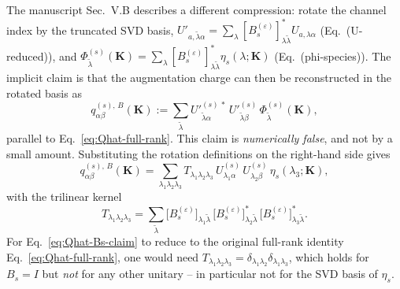 \documentclass[aps,prb,reprint,superscriptaddress,nofootinbib]{revtex4-2}
\begin{document}
The manuscript Sec.~V.B describes a different compression: rotate the
channel index by the truncated SVD basis,
\(U'_{a,\widetilde\lambda\alpha}
=\sum_\lambda[B_s^{(\varepsilon)}]^{*}_{\lambda\widetilde\lambda}
U_{a,\lambda\alpha}\) (Eq.~(U-reduced)), and
\(\Phi^{(s)}_{\widetilde\lambda}(\mathbf K)
=\sum_\lambda[B_s^{(\varepsilon)}]^{*}_{\lambda\widetilde\lambda}
\eta_s(\lambda;\mathbf K)\) (Eq.~(phi-species)).  The implicit claim is
that the augmentation charge can then be reconstructed in the rotated
basis as
\begin{equation}
q^{(s),\,B}_{\alpha\beta}(\mathbf K)
:=\sum_{\widetilde\lambda}
U'^{(s)\,*}_{\widetilde\lambda\alpha}\,
U'^{(s)}_{\widetilde\lambda\beta}\,
\Phi^{(s)}_{\widetilde\lambda}(\mathbf K),
\label{eq:Qhat-Bs-claim}
\end{equation}
parallel to Eq.~\eqref{eq:Qhat-full-rank}.  This claim is
\emph{numerically false}, and not by a small amount.  Substituting
the rotation definitions on the right-hand side gives
\begin{equation}
q^{(s),\,B}_{\alpha\beta}(\mathbf K)
=\sum_{\lambda_1\lambda_2\lambda_3}
T_{\lambda_1\lambda_2\lambda_3}\,
U^{(s)}_{\lambda_1\alpha}\,U^{(s)}_{\lambda_2\beta}\,
\eta_s(\lambda_3;\mathbf K),
\label{eq:Qhat-Bs-trilinear}
\end{equation}
with the trilinear kernel
\begin{equation}
T_{\lambda_1\lambda_2\lambda_3}
=\sum_{\widetilde\lambda}
\bigl[B_s^{(\varepsilon)}\bigr]_{\lambda_1\widetilde\lambda}\,
\bigl[B_s^{(\varepsilon)}\bigr]^{*}_{\lambda_2\widetilde\lambda}\,
\bigl[B_s^{(\varepsilon)}\bigr]^{*}_{\lambda_3\widetilde\lambda}.
\label{eq:trilinear-T}
\end{equation}
For Eq.~\eqref{eq:Qhat-Bs-claim} to reduce to the original full-rank
identity Eq.~\eqref{eq:Qhat-full-rank}, one would need
\(T_{\lambda_1\lambda_2\lambda_3}
=\delta_{\lambda_1\lambda_2}\delta_{\lambda_1\lambda_3}\),
which holds for \(B_s=I\) but \emph{not} for any other unitary -- in
particular not for the SVD basis of \(\eta_s\).
\end{document}
